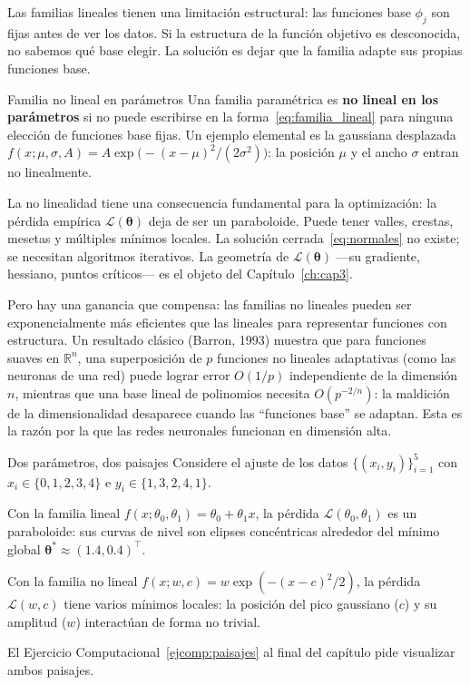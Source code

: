 
Las familias lineales tienen una limitación estructural: las funciones
base $\phi_j$ son fijas antes de ver los datos. Si la estructura de la
función objetivo es desconocida, no sabemos qué base elegir. La solución
es dejar que la familia adapte sus propias funciones base.

\begin{definicion}{Familia no lineal en parámetros}
\label{def:nolineal}
Una familia paramétrica es \textbf{no lineal en los parámetros} si no
puede escribirse en la forma~\eqref{eq:familia_lineal} para ninguna
elección de funciones base fijas. Un ejemplo elemental es la gaussiana
desplazada $f(x;\mu,\sigma,A) = A\exp\bigl(-(x-\mu)^2/(2\sigma^2)\bigr)$:
la posición $\mu$ y el ancho $\sigma$ entran no linealmente.
\end{definicion}

La no linealidad tiene una consecuencia fundamental para la optimización:
la pérdida empírica $\mathcal{L}(\bm{\theta})$ deja de ser un paraboloide.
Puede tener valles, crestas, mesetas y múltiples mínimos locales. La
solución cerrada~\eqref{eq:normales} no existe; se necesitan algoritmos
iterativos. La geometría de $\mathcal{L}(\bm{\theta})$ —su gradiente,
hessiano, puntos críticos— es el objeto del Capítulo~\ref{ch:cap3}.

Pero hay una ganancia que compensa: las familias no lineales pueden
ser exponencialmente más eficientes que las lineales para representar
funciones con estructura. Un resultado clásico (Barron, 1993) muestra
que para funciones suaves en $\mathbb{R}^n$, una superposición de
$p$ funciones no lineales adaptativas (como las neuronas de una red)
puede lograr error $O(1/p)$ independiente de la dimensión $n$, mientras
que una base lineal de polinomios necesita $O(p^{-2/n})$: la maldición
de la dimensionalidad desaparece cuando las ``funciones base'' se
adaptan. Esta es la razón por la que las redes neuronales funcionan en
dimensión alta.

\begin{ejemplo}{Dos parámetros, dos paisajes}
\label{ej:dos_paisajes}
Considere el ajuste de los datos $\{(x_i, y_i)\}_{i=1}^5$ con
$x_i \in \{0, 1, 2, 3, 4\}$ e $y_i \in \{1, 3, 2, 4, 1\}$.

Con la familia lineal $f(x;\theta_0,\theta_1) = \theta_0 + \theta_1 x$,
la pérdida $\mathcal{L}(\theta_0,\theta_1)$ es un paraboloide: sus
curvas de nivel son elipses concéntricas alrededor del mínimo global
$\bm{\theta}^* \approx (1.4, 0.4)^\top$.

Con la familia no lineal $f(x;w,c) = w\exp(-(x-c)^2/2)$, la pérdida
$\mathcal{L}(w,c)$ tiene varios mínimos locales: la posición del pico
gaussiano ($c$) y su amplitud ($w$) interactúan de forma no trivial.

El Ejercicio Computacional~\ref{ejcomp:paisajes} al final del capítulo
pide visualizar ambos paisajes.
\end{ejemplo}

